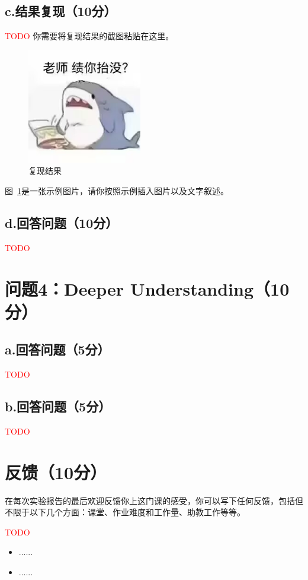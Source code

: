 \documentclass{article}
\begin{document}
\subsection*{c.结果复现（10分）}
\textcolor{red}{TODO}
你需要将复现结果的截图粘贴在这里。
\begin{figure}[H]
    \centering
    \includegraphics[width=5cm]{pics/temp.jpg}
    \caption{复现结果}
    \label{fig:indesirable_solution}
\end{figure}
图~\ref{fig:indesirable_solution}是一张示例图片，请你按照示例插入图片以及文字叙述。

\subsection*{d.回答问题（10分）}
\textcolor{red}{TODO}

\section*{问题4：Deeper Understanding（10分）}
\subsection*{a.回答问题（5分）}
\textcolor{red}{TODO}

\subsection*{b.回答问题（5分）}
\textcolor{red}{TODO}


\section*{反馈（10分）}
在每次实验报告的最后欢迎反馈你上这门课的感受，你可以写下任何反馈，包括但不限于以下几个方面：课堂、作业难度和工作量、助教工作等等。

\textcolor{red}{TODO} %
\begin{itemize}
    \item ......
    \item ......
\end{itemize}
\end{document}
